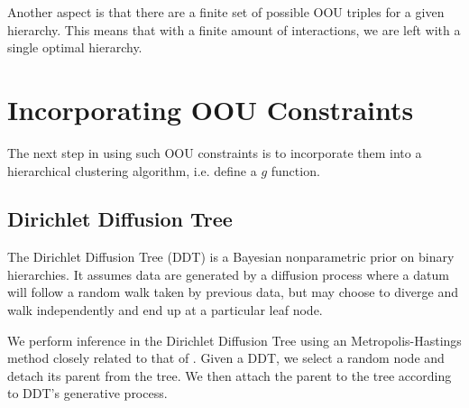 \documentclass[12pt]{article}
\begin{document}
Another aspect is that there are a finite set of possible
OOU triples for a given hierarchy.
This means that with a finite amount of interactions,
we are left with a single optimal hierarchy.

\section{Incorporating OOU Constraints}
The next step in using such OOU constraints is to incorporate them into a hierarchical
clustering algorithm, i.e. define a $g$ function.

\subsection{Dirichlet Diffusion Tree}
The Dirichlet Diffusion Tree (DDT) is a Bayesian nonparametric prior on 
binary hierarchies.
It assumes data are generated by a diffusion process
where a datum will follow a random walk taken by
previous data, but may choose to diverge
and walk independently and end up at a
particular leaf node.

We perform inference in the Dirichlet Diffusion Tree 
using an Metropolis-Hastings method closely related to 
that of \citet{Neal2003}. 
Given a DDT, we select
a random node and detach its parent from the tree.
We then attach the parent to the tree
according to DDT's generative process.


\end{document}
